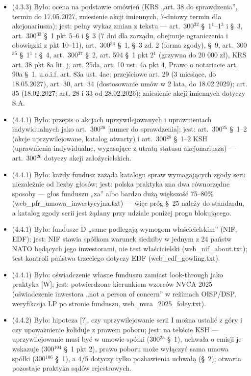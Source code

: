 \documentclass[12pt,a4paper]{report}
\begin{document}
\begin{itemize}
  \item (4.3.3) Było: ocena na podstawie omówień (KRS „art. 38 do sprawdzenia”, termin do 17.05.2027, zniesienie akcji imiennych, 7-dniowy termin dla akcjonariusza); jest: pełny wykaz zmian z tekstu --- art.~300$^{32}$ §~1$^{1}$--1$^{3}$ i §~3, art.~300$^{33}$ §~1 pkt 5--6 i §~3 (7 dni dla zarządu, obejmuje ograniczenia i obowiązki z pkt 10--11), art.~300$^{34}$ §~1, §~3 zd. 2 (forma zgody), §~9, art.~300$^{35}$ §~1$^{1}$ i §~4, art.~300$^{37}$ §~2, art. 594 §~1 pkt 2$^{1}$ (grzywna do 20 000 zł), KRS art. 38 pkt 8a lit. j, art. 25da, art. 10 ust. 4a pkt 4, Prawo o notariacie art. 90a §~1, u.o.i.f. art. 83a ust. 4ac; przejściowe art. 29 (3 miesiące, do 18.05.2027), art. 30, art. 34 (dostosowanie umów w 2 lata, do 18.02.2029); art. 35 (18.02.2027; art. 28 i 33 od 28.02.2026); zniesienie akcji imiennych dotyczy S.A.
  \item (4.4.1) Było: przepis o akcjach uprzywilejowanych i uprawnieniach indywidualnych jako art.~300$^{26}$ [numer do sprawdzenia]; jest: art.~300$^{25}$ §~1–2 (akcje uprzywilejowane, katalog otwarty) i art.~300$^{28}$ §~1–2 KSH (uprawnienia indywidualne, wygasające z utratą statusu akcjonariusza) — art.~300$^{26}$ dotyczy akcji założycielskich.
  \item (4.4.1) Było: każdy fundusz zażąda katalogu spraw wymagających zgody serii niezależnie od liczby głosów; jest: polska praktyka zna dwa równorzędne sposoby — głos funduszu „za” albo bardzo dużą większość 75–80\% (web\_pfr\_umowa\_inwestycyjna.txt) — więc próg §~25 należy do standardu, a katalog zgody serii jest żądany przy udziale poniżej progu blokującego.
  \item (4.4.1) Było: fundusze D „same podlegają wymogom właścicielskim” (NIF, EDF); jest: NIF stawia spółkom warunek siedziby w jednym z 24 państw NATO będących jego inwestorami, nie test właścicielski (web\_nif\_about.txt); test kontroli państwa trzeciego dotyczy EDF (web\_edf\_gowling.txt).
  \item (4.4.1) Było: oświadczenie własne funduszu zamiast look-through jako praktyka [W]; jest: potwierdzone kierunkiem wzorców NVCA 2025 (oświadczenie inwestora „not a person of concern” w reżimach OISP/DSP, weryfikacja LP po stronie funduszu, web\_nvca\_2025\_foley.txt).
  \item (4.4.2) Było: hipoteza [?], czy uprzywilejowanie serii I można ustalić z góry i czy upoważnienie koliduje z prawem poboru; jest: na tekście KSH — uprzywilejowanie musi być w umowie spółki (300$^{25}$ §~1), uchwała o emisji je wskazuje (300$^{104}$ §~1 pkt 2), prawo poboru może wyłączyć sama umowa spółki (300$^{106}$ §~1), a 4/5 dotyczy tylko pozbawienia uchwałą (§~2); otwarta pozostaje praktyka sądów rejestrowych.
\end{itemize}
\end{document}
